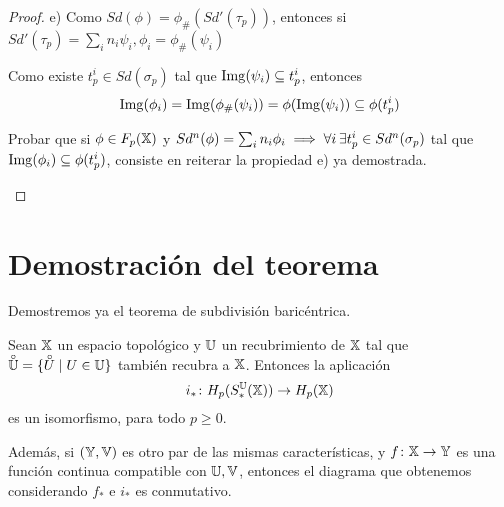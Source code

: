 \begin{proof}
  e) Como $Sd(\phi) = \phi_\#(Sd'(\tau_p))$, entonces si $Sd'(\tau_p) = \sum_i n_i \psi_i, \phi_i = \phi_\#(\psi_i)$

  Como existe $t_p^i \in Sd(\sigma_p)$ tal que $\operatorname{Img}(\psi_i) \subseteq t_p^i$, entonces
  \[\operatorname{Img}(\phi_i) = \operatorname{Img}(\phi_\#(\psi_i)) = \phi(\operatorname{Img}(\psi_i)) \subseteq \phi(t_p^i)\]

  \begin{remark}
    Probar que si $\phi \in F_p({\mathbb X})$ y $Sd^n(\phi) = \sum_i n_i \phi_i \implies \forall i \hspace{0.2em} \exists t_p^i \in Sd^n(\sigma_p)$ tal que
    $\operatorname{Img}(\phi_i) \subseteq \phi(t_p^i)$, consiste en reiterar la propiedad e) ya demostrada.
  \end{remark}

\end{proof}

\section{Demostración del teorema}

Demostremos ya el teorema de subdivisión baricéntrica.

\begin{theorem}
  Sean ${\mathbb X}$ un espacio topológico y ${\mathbb U}$ un recubrimiento de ${\mathbb X}$ tal que $\interior{\U} = \{\interior{U} \mid U \in \U\}$
  también recubra a ${\mathbb X}$. Entonces la aplicación
  \[ i_* \colon H_p(S_*^{\mathbb U}({\mathbb X})) \to H_p({\mathbb X}) \]
  es un isomorfismo, para todo $p \geq 0$.

  Además, si $({\mathbb Y}, {\mathbb V})$ es otro par de las mismas características, y $f \colon {\mathbb X} \to {\mathbb Y}$ es una función continua
  compatible con ${\mathbb U}, {\mathbb V}$, entonces el diagrama que obtenemos considerando $f_*$ e $i_*$ es conmutativo.
\end{theorem}

